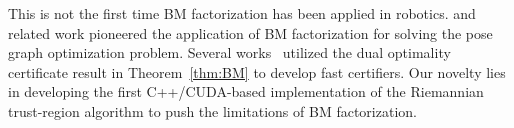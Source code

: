 \begin{remark}
    This is not the first time BM factorization has been applied in robotics. \sesync and related work \cite{dellaert2020shonan,rosen2021scalable} pioneered the application of BM factorization for solving the pose graph optimization problem. Several works~\cite{garcia2021certifiable,garcia2024certifiable,holmes2023efficient} utilized the dual optimality certificate result in Theorem~\ref{thm:BM} to develop fast certifiers. Our novelty lies in developing the first C++/CUDA-based implementation of the Riemannian trust-region algorithm to push the limitations of BM factorization.
\end{remark}

